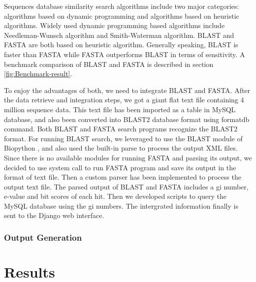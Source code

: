 \documentclass[11pt,letterpaper,twoside,english]{article}
\begin{document}
Sequences database similarity search algorithms include two major
categories: algorithms based on dynamic programming and algorithms
based on heuristic algorithms. Widely used dynamic programming based
algorithms include Needleman-Wunsch algorithm and Smith-Waterman algorithm.
BLAST and FASTA are both based on heuristic algorithm. Generally speaking,
BLAST is faster than FASTA while FASTA outperforms BLAST in terms
of sensitivity. A benchmark comparison of BLAST and FASTA is described
in section \ref{fig:Benchmark-result}.

To enjoy the advantages of both, we need to integrate BLAST and FASTA.
After the data retrieve and integration steps, we got a giant flat
text file containing 4 million sequence data. This text file has been
imported as a table in MySQL database, and also been converted into
BLAST2 database format using formatdb command. Both BLAST and FASTA
search programs recognize the BLAST2 format. For running BLAST search,
we leveraged to use the BLAST module of Biopython \citet{Cock:2009p22197},
and also used the built-in parse to process the output XML files.
Since there is no available modules for running FASTA and parsing
its output, we decided to use system call to run FASTA program and
save its output in the format of text file. Then a custom parser has
been implemented to process the output text file. The parsed output
of BLAST and FASTA includes a gi number, e-value and bit scores of
each hit. Then we developed scripts to query the MySQL database using
the gi numbers. The intergrated information finally is sent to the
Django web interface.










\subsubsection{\label{sub:Output-Generation}Output Generation}




\section{Results}

\end{document}
